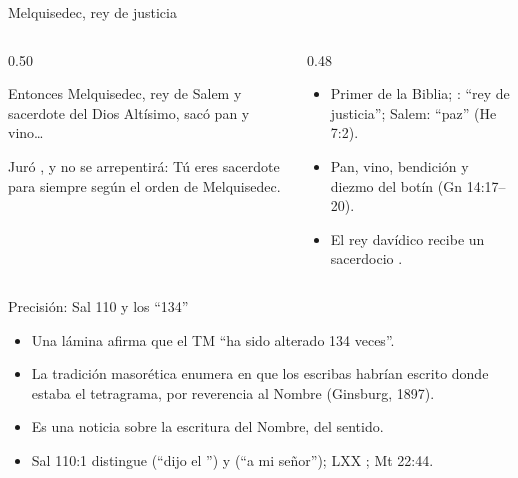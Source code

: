 \begin{frame}{Melquisedec, rey de justicia}
\begin{columns}[t,onlytextwidth]
\begin{column}{0.50\textwidth}
\begin{cita}[fontupper=\scriptsize\itshape]Entonces Melquisedec, rey de Salem y sacerdote del Dios Altísimo, sacó pan y vino\ldots{}\end{cita}
\begin{cita}[fontupper=\scriptsize\itshape]Juró \SENOR, y no se arrepentirá: Tú eres sacerdote para siempre según el orden de Melquisedec.\end{cita}
\end{column}
\begin{column}{0.48\textwidth}\scriptsize
\begin{itemize}
\item Primer  de la Biblia; : ``rey de justicia''; Salem: ``paz'' (He 7:2).
\item Pan, vino, bendición y diezmo del botín (Gn 14:17--20).
\item El rey davídico recibe un sacerdocio .
\end{itemize}
\end{column}
\end{columns}
\end{frame}

\begin{frame}{Precisión: Sal 110 y los ``134''}
\small
\begin{itemize}
\item Una lámina afirma que el TM ``ha sido alterado 134 veces''.
\item La tradición masorética enumera  en que los escribas habrían escrito  donde estaba el tetragrama, por reverencia al Nombre (Ginsburg, 1897).
\item Es una noticia sobre la escritura del Nombre,  del sentido.
\item Sal 110:1 distingue  (``dijo el \SENOR'') y  (``a mi señor''); LXX ; Mt 22:44.
\end{itemize}
\end{frame}

